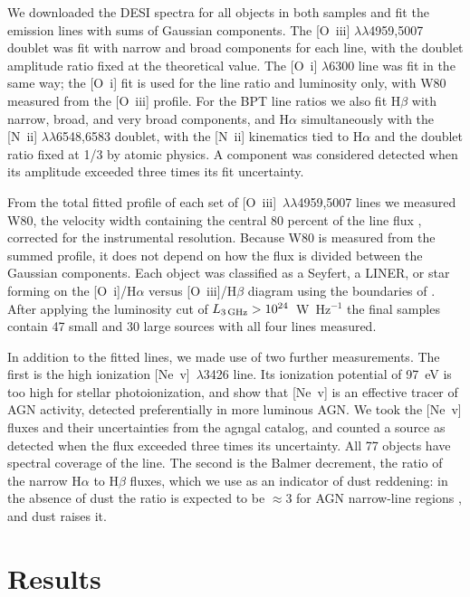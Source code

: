 \documentclass[linenumbers,trackchanges]{aastex701}
\begin{document}
We downloaded the DESI spectra for all objects in both samples and fit the emission lines with sums of Gaussian components. The [O~{\sc iii}] $\lambda\lambda$4959,5007 doublet was fit with narrow and broad components for each line, with the doublet amplitude ratio fixed at the theoretical value. The [O~{\sc i}] $\lambda$6300 line was fit in the same way; the [O~{\sc i}] fit is used for the line ratio and luminosity only, with W80 measured from the [O~{\sc iii}] profile. For the BPT line ratios we also fit H$\beta$ with narrow, broad, and very broad components, and H$\alpha$ simultaneously with the [N~{\sc ii}] $\lambda\lambda$6548,6583 doublet, with the [N~{\sc ii}] kinematics tied to H$\alpha$ and the doublet ratio fixed at 1/3 by atomic physics. A component was considered detected when its amplitude exceeded three times its fit uncertainty.

From the total fitted profile of each set of [O~{\sc iii}]~$\lambda\lambda$4959,5007 lines we measured W80, the velocity width containing the central 80 percent of the line flux \citep{liu2013}, corrected for the instrumental resolution. Because W80 is measured from the summed profile, it does not depend on how the flux is divided between the Gaussian components. Each object was classified as a Seyfert, a LINER, or star forming on the [O~{\sc i}]/H$\alpha$ versus [O~{\sc iii}]/H$\beta$ diagram using the boundaries of \citet{kewley2006}. After applying the luminosity cut of $L_{\rm 3\,GHz} > 10^{24}$~W~Hz$^{-1}$ the final samples contain 47 small and 30 large sources with all four lines measured.

In addition to the fitted lines, we made use of two further measurements. The first is the high ionization [Ne~{\sc v}]~$\lambda$3426 line. Its ionization potential of 97~eV is too high for stellar photoionization, and \citet{negus23} show that [Ne~{\sc v}] is an effective tracer of AGN activity, detected preferentially in more luminous AGN. We took the [Ne~{\sc v}] fluxes and their uncertainties from the {\sc agngal} catalog, and counted a source as detected when the flux exceeded three times its uncertainty. All 77 objects have spectral coverage of the line. The second is the Balmer decrement, the ratio of the narrow H$\alpha$ to H$\beta$ fluxes, which we use as an indicator of dust reddening: in the absence of dust the ratio is expected to be $\approx 3$ for AGN narrow-line regions \citep[e.g.][]{osterbrock89}, and dust raises it.

\section{Results}
\end{document}

